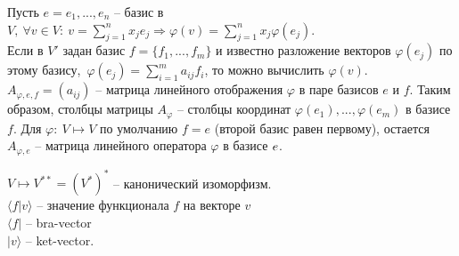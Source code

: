 \documentclass[a4paper, 12pt]{article}
\theoremstyle{definition}
\begin{document}
    Пусть $e = {e_1,...,e_n}$ -- базис в $V,\ \forall v \in V:\ 
    v = \sum\limits_{j=1}^nx_je_j\Longrightarrow \varphi(v) =
    \sum\limits_{j=1}^nx_j\varphi(e_j)$.\\
    Если в $V'$ задан базис $f = \{f_1,...,f_m\}$ и известно
    разложение векторов $\varphi(e_j)$ по этому базису,\ 
    $\varphi(e_j) = \sum\limits_{i=1}^ma_{ij}f_i$, то можно
    вычислить $\varphi(v)$.\\$A_{\varphi,e,f} = (a_{ij})$ --
    матрица линейного отображения $\varphi$ в паре базисов
    $e$ и $f$. Таким образом, столбцы матрицы $A_\varphi$ --
    столбцы координат $\varphi(e_1),...,\varphi(e_m)$ в базисе
    $f$. Для $\varphi:\ V\longmapsto V$ по умолчанию $f=e$
    (второй базис равен первому), остается $A_{\varphi,e}$ --
    матрица линейного оператора $\varphi$ в базисе $e\\$.

    $V \mapsto V^{**} = (V^*)^*$ -- канонический изоморфизм.\\
    $\langle f|v \rangle$ -- значение функционала $f$ на векторе $v$\\
    $\langle f|$ -- bra-vector\\ $|v \rangle$ -- ket-vector.
\end{document}
